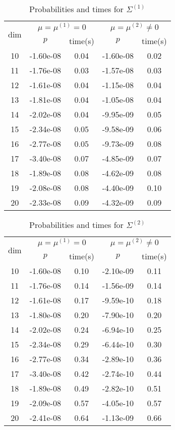\begin{table}[htbp]
\begin{center}
\begin{tabular}{c|cccc}
\hline
\multirow{2}{*}{dim}&
\multicolumn{2}{c}{$\mu=\mu^{(1)}=0$}&
\multicolumn{2}{c}{$\mu=\mu^{(2)}\neq 0$}\\
& $p$ & time(s) & $p$ & time(s)  \\
\hline
10 & -1.60e-08 & 0.04 & -1.60e-08 & 0.02 \\ 
11 & -1.76e-08 & 0.03 & -1.57e-08 & 0.03 \\ 
12 & -1.61e-08 & 0.04 & -1.15e-08 & 0.04 \\ 
13 & -1.81e-08 & 0.04 & -1.05e-08 & 0.04 \\ 
14 & -2.02e-08 & 0.04 & -9.95e-09 & 0.05 \\ 
15 & -2.34e-08 & 0.05 & -9.58e-09 & 0.06 \\ 
16 & -2.77e-08 & 0.05 & -9.73e-09 & 0.08 \\ 
17 & -3.40e-08 & 0.07 & -4.85e-09 & 0.07 \\ 
18 & -1.89e-08 & 0.08 & -4.62e-09 & 0.08 \\ 
19 & -2.08e-08 & 0.08 & -4.40e-09 & 0.10 \\ 
20 & -2.33e-08 & 0.09 & -4.32e-09 & 0.09 \\ 
\hline
\end{tabular}
\end{center}
\caption{Probabilities  and times for $\Sigma^{(1)}$}
\label{tab:hirotsu-1}
\end{table}

\begin{table}[htbp]
\begin{center}
\begin{tabular}{c|cccc}
\hline
\multirow{2}{*}{dim}&
\multicolumn{2}{c}{$\mu=\mu^{(1)}=0$}&
\multicolumn{2}{c}{$\mu=\mu^{(2)}\neq 0$}\\
& $p$ & time(s) & $p$ & time(s)  \\
\hline
10 & -1.60e-08 & 0.10 & -2.10e-09 & 0.11 \\ 
11 & -1.76e-08 & 0.14 & -1.56e-09 & 0.14 \\ 
12 & -1.61e-08 & 0.17 & -9.59e-10 & 0.18 \\ 
13 & -1.80e-08 & 0.20 & -7.90e-10 & 0.20 \\ 
14 & -2.02e-08 & 0.24 & -6.94e-10 & 0.25 \\ 
15 & -2.34e-08 & 0.29 & -6.44e-10 & 0.30 \\ 
16 & -2.77e-08 & 0.34 & -2.89e-10 & 0.36 \\ 
17 & -3.40e-08 & 0.42 & -2.74e-10 & 0.44 \\ 
18 & -1.89e-08 & 0.49 & -2.82e-10 & 0.51 \\ 
19 & -2.09e-08 & 0.57 & -4.05e-10 & 0.57 \\ 
20 & -2.41e-08 & 0.64 & -1.13e-09 & 0.66 \\ 
\hline
\end{tabular}
\end{center}
\caption{Probabilities  and times for $\Sigma^{(2)}$}
\label{tab:hirotsu-2}
\end{table}

